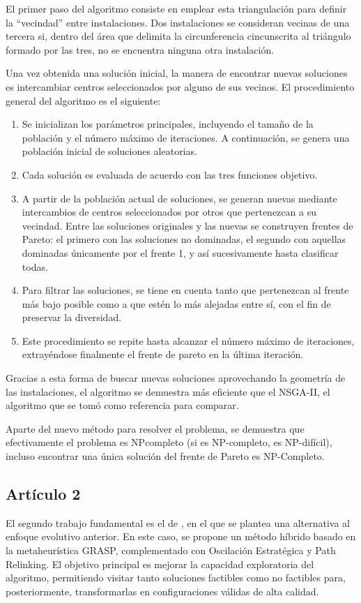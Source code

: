 \documentclass[12pt,a4paper]{book}
\begin{document}
El primer paso del algoritmo consiste en emplear esta triangulación para definir la ``vecindad'' entre instalaciones. Dos instalaciones se consideran vecinas de una tercera si, 
dentro del área que delimita la circunferencia cincunscrita al triángulo formado por las tres, no se encuentra ninguna otra instalación. 

Una vez obtenida una solución inicial, la manera de encontrar nuevas soluciones es intercambiar centros seleccionados por alguno de sus vecinos. El procedimiento general del algoritmo es el siguiente:

\begin{enumerate}
    \item Se inicializan los parámetros principales, incluyendo el tamaño de la población y el número máximo de iteraciones. A continuación, se genera una población inicial de soluciones aleatorias.
    \item Cada solución es evaluada de acuerdo con las tres funciones objetivo.
    \item A partir de la población actual de soluciones, se generan nuevas mediante intercambios de centros seleccionados por otros que pertenezcan a su vecindad. Entre las soluciones originales y las nuevas se construyen frentes
    de Pareto: el primero con las soluciones no dominadas, el segundo con aquellas dominadas únicamente por el frente 1, y así sucesivamente hasta clasificar todas. 
    \item Para filtrar las soluciones, se tiene en cuenta tanto que pertenezcan al frente más bajo posible como a que estén lo más alejadas entre sí, con el fin de preservar la diversidad. 
    \item Este procedimiento se repite hasta alcanzar el número máximo de iteraciones,  extrayéndose finalmente el frente de pareto en la última iteración.
\end{enumerate}
Gracias a esta forma de buscar nuevas soluciones aprovechando la geometría de las instalaciones, el algoritmo se demuestra más eficiente que el NSGA-II, el algoritmo que se tomó 
como referencia para comparar. 

Aparte del nuevo método para resolver el problema, se demuestra que efectivamente el problema es NP\-completo (si es NP-completo, es NP-difícil), incluso encontrar una única
solución del frente de Pareto es NP-Completo.

\subsection{Artículo 2}
El segundo trabajo fundamental es el de \cite{k-Balanced_2}, en el que se plantea una alternativa al enfoque evolutivo anterior. En este caso, se propone un método híbrido basado en la metaheurística GRASP, complementado con Oscilación Estratégica y Path Relinking. El objetivo principal es mejorar la capacidad exploratoria del algoritmo, permitiendo visitar tanto soluciones factibles como no factibles para, posteriormente, transformarlas en configuraciones válidas de alta calidad.
\end{document}
